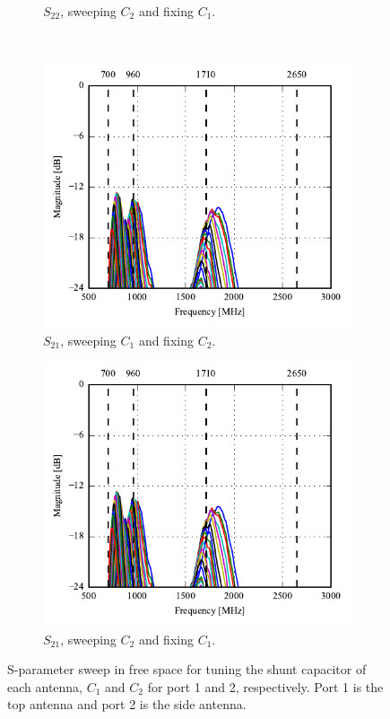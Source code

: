 \begin{figure}[htbp]
\begin{subfigure}[b]{0.49\linewidth}
        \caption{$S_{22}$, sweeping $C_2$ and fixing $C_1$.}
    \end{subfigure}
~
    \begin{subfigure}[b]{0.49\linewidth}
        \centering
        \includegraphics{img/tech_sol/monopole/5mm/meas/S21.pdf}
        \caption{$S_{21}$, sweeping $C_1$ and fixing $C_2$.}
    \end{subfigure}
    \hfill
    \begin{subfigure}[b]{0.49\linewidth}
        \centering
        \includegraphics{img/tech_sol/monopole/5mm/meas/S21.pdf}
        \caption{$S_{21}$, sweeping $C_2$ and fixing $C_1$.}
    \end{subfigure}
    \caption{S-parameter sweep in free space for tuning the shunt capacitor of each antenna, $C_1$ and $C_2$ for port 1 and 2, respectively. Port 1 is the top antenna and port 2 is the side antenna.}
    \label{fig:sparam_mono_mini_meas}
\end{figure}

